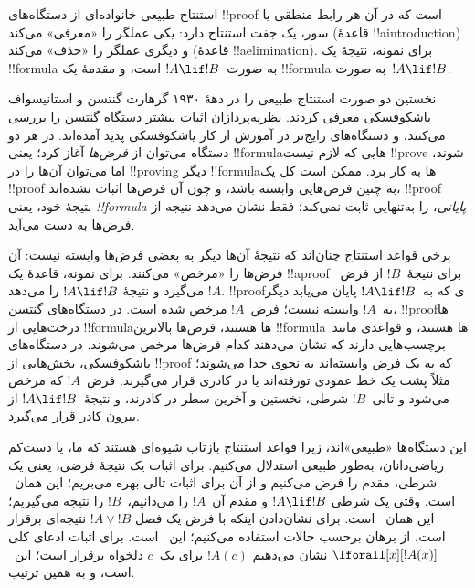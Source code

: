 \documentclass[../../../include/open-logic-section]{subfiles}
\begin{document}


استنتاج طبیعی خانواده‌ای از دستگاه‌های !!{proof} است که در آن هر رابط
منطقی یا سور، یک جفت استنتاج دارد: یکی عملگر را «معرفی» می‌کند
(قاعدهٔ !!a{introduction}) و دیگری عملگر را «حذف» می‌کند
(قاعدهٔ !!a{elimination}). برای نمونه، نتیجهٔ \Intro{\lif} یک
!!{formula} به صورت~$!A \lif !B$ است، و مقدمهٔ \Elim{\lif} یک
!!{formula} به صورت~$!A \lif !B$.

نخستین دو صورت استنتاج طبیعی را در دههٔ ۱۹۳۰ گرهارت گنتسن و
استانیسواف یاشکوفسکی معرفی کردند. نظریه‌پردازان اثبات بیشتر دستگاه
گنتسن را بررسی می‌کنند، و دستگاه‌های رایج‌تر در آموزش از کار یاشکوفسکی
پدید آمده‌اند. در هر دو دستگاه می‌توان از \emph{فرض‌ها} آغاز کرد؛ یعنی
!!{formula}هایی که لازم نیست !!{prove} شوند، اما می‌توان آن‌ها را در
!!{proving} دیگر !!{formula}ها به کار برد. ممکن است کل یک !!{proof} به
چنین فرض‌هایی وابسته باشد، و چون آن فرض‌ها اثبات نشده‌اند، !!{proof}
نتیجهٔ خود، یعنی \emph{!!{formula} پایانی}، را به‌تنهایی ثابت نمی‌کند؛
فقط نشان می‌دهد نتیجه از فرض‌ها به دست می‌آید.

برخی قواعد استنتاج چنان‌اند که نتیجهٔ آن‌ها دیگر به بعضی فرض‌ها وابسته
نیست: آن فرض‌ها را «مرخص» می‌کنند. برای نمونه، قاعدهٔ \Intro{\lif} یک
!!a{proof} برای نتیجهٔ~$!B$ از فرض~$!A$ می‌گیرد و نتیجهٔ
$!A \lif !B$ را می‌دهد. !!{proof}ی که به~$!A \lif !B$ پایان می‌یابد
دیگر به~$!A$ وابسته نیست؛ فرض~$!A$ مرخص شده است. در دستگاه‌های گنتسن،
!!{proof}ها درخت‌هایی از !!{formula}ها هستند، فرض‌ها بالاترین
!!{formula}ها هستند، و قواعدی مانند~\Intro{\lif} برچسب‌هایی دارند که
نشان می‌دهند کدام فرض‌ها مرخص می‌شوند. در دستگاه‌های یاشکوفسکی،
بخش‌هایی از !!{proof} که به یک فرض وابسته‌اند به نحوی جدا می‌شوند؛
مثلاً پشت یک خط عمودی تورفته‌اند یا در کادری قرار می‌گیرند. فرض~$!A$
که مرخص می‌شود و تالی~$!B$ شرطی، نخستین و آخرین سطر در کادرند، و
نتیجهٔ~$!A \lif !B$ از \Intro{\lif} بیرون کادر قرار می‌گیرد.

این دستگاه‌ها «طبیعی»اند، زیرا قواعد استنتاج بازتاب شیوه‌ای هستند که
ما، یا دست‌کم ریاضی‌دانان، به‌طور طبیعی استدلال می‌کنیم. برای اثبات یک
نتیجهٔ فرضی، یعنی یک شرطی، مقدم را فرض می‌کنیم و از آن برای اثبات تالی
بهره می‌بریم؛ این همان~\Intro{\lif} است. وقتی یک شرطی
$!A \lif !B$ و مقدم آن~$!A$ را می‌دانیم،~$!B$ را نتیجه می‌گیریم؛ این
همان~\Elim{\lif} است. برای نشان‌دادن اینکه با فرض یک فصل
$!A \lor !B$ نتیجه‌ای برقرار است، از برهان برحسب حالات استفاده
می‌کنیم؛ این~\Elim{\lor} است. برای اثبات ادعای کلی
$\lforall[x][!A(x)]$ نشان می‌دهیم $!A(c)$ برای یک~$c$ دلخواه برقرار
است؛ این~\Intro{\lforall} است، و به همین ترتیب.
\end{document}
